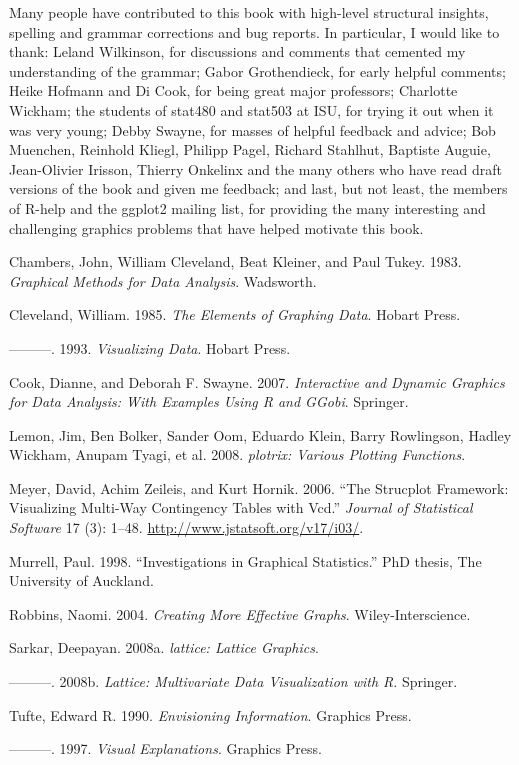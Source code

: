 Many people have contributed to this book with high-level structural
insights, spelling and grammar corrections and bug reports. In
particular, I would like to thank: Leland Wilkinson, for discussions and
comments that cemented my understanding of the grammar; Gabor
Grothendieck, for early helpful comments; Heike Hofmann and Di Cook, for
being great major professors; Charlotte Wickham; the students of stat480
and stat503 at ISU, for trying it out when it was very young; Debby
Swayne, for masses of helpful feedback and advice; Bob Muenchen,
Reinhold Kliegl, Philipp Pagel, Richard Stahlhut, Baptiste Auguie,
Jean-Olivier Irisson, Thierry Onkelinx and the many others who have read
draft versions of the book and given me feedback; and last, but not
least, the members of R-help and the ggplot2 mailing list, for providing
the many interesting and challenging graphics problems that have helped
motivate this book.

Chambers, John, William Cleveland, Beat Kleiner, and Paul Tukey. 1983.
\emph{Graphical Methods for Data Analysis}. Wadsworth.

Cleveland, William. 1985. \emph{The Elements of Graphing Data}. Hobart
Press.

---------. 1993. \emph{Visualizing Data}. Hobart Press.

Cook, Dianne, and Deborah F. Swayne. 2007. \emph{Interactive and Dynamic
Graphics for Data Analysis: With Examples Using R and GGobi}. Springer.

Lemon, Jim, Ben Bolker, Sander Oom, Eduardo Klein, Barry Rowlingson,
Hadley Wickham, Anupam Tyagi, et al. 2008. \emph{plotrix: Various
Plotting Functions}.

Meyer, David, Achim Zeileis, and Kurt Hornik. 2006. ``The Strucplot
Framework: Visualizing Multi-Way Contingency Tables with Vcd.''
\emph{Journal of Statistical Software} 17 (3): 1--48.
\url{http://www.jstatsoft.org/v17/i03/}.

Murrell, Paul. 1998. ``Investigations in Graphical Statistics.''
PhD thesis, The University of Auckland.

Robbins, Naomi. 2004. \emph{Creating More Effective Graphs}.
Wiley-Interscience.

Sarkar, Deepayan. 2008a. \emph{lattice: Lattice Graphics}.

---------. 2008b. \emph{Lattice: Multivariate Data Visualization with
R}. Springer.

Tufte, Edward R. 1990. \emph{Envisioning Information}. Graphics Press.

---------. 1997. \emph{Visual Explanations}. Graphics Press.

